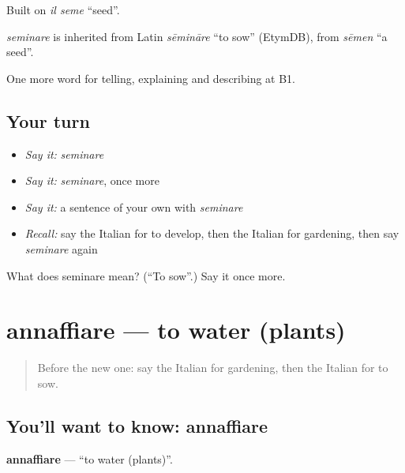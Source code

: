 Built on \emph{il seme} \textquotedblleft{}seed\textquotedblright{}.

\begin{cousinweb}
\emph{seminare} is inherited from Latin \emph{sēmināre} \textquotedblleft{}to sow\textquotedblright{} (EtymDB), from \emph{sēmen} \textquotedblleft{}a seed\textquotedblright{}.
\end{cousinweb}

\begin{grammarlens}[title={What you've built}]
One more word for telling, explaining and describing at B1.
\end{grammarlens}

\subsection*{Your turn}
\begin{itemize}
\raggedright
  \item \emph{Say it:} \emph{seminare}
  \item \emph{Say it:} \emph{seminare}, once more
  \item \emph{Say it:} a sentence of your own with \emph{seminare}
  \item \emph{Recall:} say the Italian for to develop, then the Italian for gardening, then say \emph{seminare} again
\end{itemize}

\begin{tcolorbox}[breakable,colback=teal!4,colframe=teal!35!black,title={Before you move on}]
What does seminare mean? (\textquotedblleft{}To sow\textquotedblright{}.) Say it once more.
\end{tcolorbox}
\section[annaffiare]{annaffiare — to water (plants)}

\label{lesson:IT-C507-annaffiare}



\begin{quote}
Before the new one: say the Italian for gardening, then the Italian for to sow.
\end{quote}

\subsection*{You'll want to know: annaffiare}
\textbf{annaffiare} — \textquotedblleft{}to water (plants)\textquotedblright{}.

